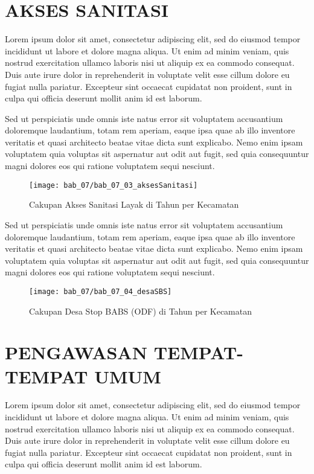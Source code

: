 \section{AKSES SANITASI}
Lorem ipsum dolor sit amet, consectetur adipiscing elit, sed do eiusmod tempor incididunt ut labore et dolore magna aliqua. Ut enim ad minim veniam, quis nostrud exercitation ullamco laboris nisi ut aliquip ex ea commodo consequat. Duis aute irure dolor in reprehenderit in voluptate velit esse cillum dolore eu fugiat nulla pariatur. Excepteur sint occaecat cupidatat non proident, sunt in culpa qui officia deserunt mollit anim id est laborum.

Sed ut perspiciatis unde omnis iste natus error sit voluptatem accusantium doloremque laudantium, totam rem aperiam, eaque ipsa quae ab illo inventore veritatis et quasi architecto beatae vitae dicta sunt explicabo. Nemo enim ipsam voluptatem quia voluptas sit aspernatur aut odit aut fugit, sed quia consequuntur magni dolores eos qui ratione voluptatem sequi nesciunt.

\begin{figure}[H]
    \centering
    \label{fig:Cakupan-Akses-Sanitasi}
    \texttt{[image: bab\_07/bab\_07\_03\_aksesSanitasi]}
    \caption{Cakupan Akses Sanitasi Layak di \namaKabupaten Tahun \tP per Kecamatan}
\end{figure}

Sed ut perspiciatis unde omnis iste natus error sit voluptatem accusantium doloremque laudantium, totam rem aperiam, eaque ipsa quae ab illo inventore veritatis et quasi architecto beatae vitae dicta sunt explicabo. Nemo enim ipsam voluptatem quia voluptas sit aspernatur aut odit aut fugit, sed quia consequuntur magni dolores eos qui ratione voluptatem sequi nesciunt.

\begin{figure}[H]
    \centering
    \label{fig:Cakupan-Akses-Sanitasi}
    \texttt{[image: bab\_07/bab\_07\_04\_desaSBS]}
    \caption{Cakupan Desa Stop BABS (ODF) di \namaKabupaten Tahun \tP per Kecamatan}
\end{figure}

\section{PENGAWASAN TEMPAT-TEMPAT UMUM}
Lorem ipsum dolor sit amet, consectetur adipiscing elit, sed do eiusmod tempor incididunt ut labore et dolore magna aliqua. Ut enim ad minim veniam, quis nostrud exercitation ullamco laboris nisi ut aliquip ex ea commodo consequat. Duis aute irure dolor in reprehenderit in voluptate velit esse cillum dolore eu fugiat nulla pariatur. Excepteur sint occaecat cupidatat non proident, sunt in culpa qui officia deserunt mollit anim id est laborum.

